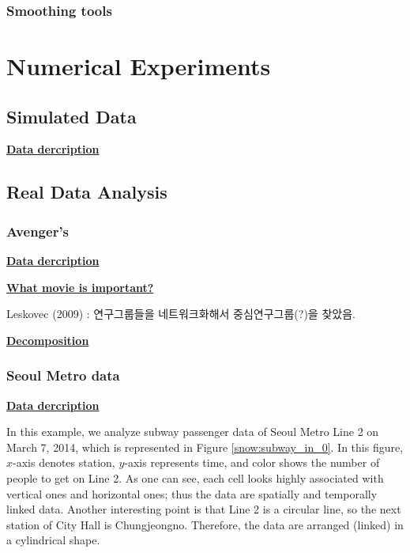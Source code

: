 \documentclass[preprint, review, 12pt]{article}
\theoremstyle{definition}
\theoremstyle{remark}
\begin{document}
\subsubsection{Smoothing tools}

\section{Numerical Experiments}
\subsection{Simulated Data}
\noindent\textbf{\underline{Data dercription}}

\subsection{Real Data Analysis}
\subsubsection{Avenger's}
\noindent\textbf{\underline{Data dercription}}

\noindent\textbf{\underline{What movie is important?}}

Leskovec (2009) : 연구그룹들을 네트워크화해서 중심연구그룹(?)을 찾았음. 

\noindent\textbf{\underline{Decomposition}}


\subsubsection{Seoul Metro data}
\noindent\textbf{\underline{Data dercription}}

In this example, we analyze subway passenger data of Seoul Metro Line 2 on March 7, 2014, which is represented in Figure \ref{snow:subway_in_0}. In this figure, $x$-axis denotes station, $y$-axis represents time, and color shows the number of people to get on Line 2. As one can see, each cell looks highly associated with vertical ones and horizontal ones; thus the data are spatially and temporally linked data. Another interesting point is that Line 2 is a circular line, so the next station of City Hall is Chungjeongno. Therefore, the data are arranged (linked) in a cylindrical shape.
\end{document}
